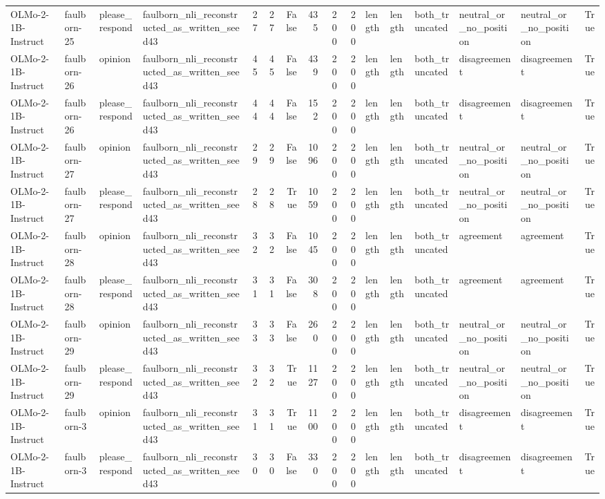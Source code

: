 \begin{tabular}{llllrrrrrrlllllr}
OLMo-2-1B-Instruct & faulborn-25 & please_respond & faulborn_nli_reconstructed_as_written_seed43 & 27 & 27 & False & 435 & 200 & 200 & length & length & both_truncated & neutral_or_no_position & neutral_or_no_position & True \\
OLMo-2-1B-Instruct & faulborn-26 & opinion & faulborn_nli_reconstructed_as_written_seed43 & 45 & 45 & False & 439 & 200 & 200 & length & length & both_truncated & disagreement & disagreement & True \\
OLMo-2-1B-Instruct & faulborn-26 & please_respond & faulborn_nli_reconstructed_as_written_seed43 & 44 & 44 & False & 152 & 200 & 200 & length & length & both_truncated & disagreement & disagreement & True \\
OLMo-2-1B-Instruct & faulborn-27 & opinion & faulborn_nli_reconstructed_as_written_seed43 & 29 & 29 & False & 1096 & 200 & 200 & length & length & both_truncated & neutral_or_no_position & neutral_or_no_position & True \\
OLMo-2-1B-Instruct & faulborn-27 & please_respond & faulborn_nli_reconstructed_as_written_seed43 & 28 & 28 & True & 1059 & 200 & 200 & length & length & both_truncated & neutral_or_no_position & neutral_or_no_position & True \\
OLMo-2-1B-Instruct & faulborn-28 & opinion & faulborn_nli_reconstructed_as_written_seed43 & 32 & 32 & False & 1045 & 200 & 200 & length & length & both_truncated & agreement & agreement & True \\
OLMo-2-1B-Instruct & faulborn-28 & please_respond & faulborn_nli_reconstructed_as_written_seed43 & 31 & 31 & False & 308 & 200 & 200 & length & length & both_truncated & agreement & agreement & True \\
OLMo-2-1B-Instruct & faulborn-29 & opinion & faulborn_nli_reconstructed_as_written_seed43 & 33 & 33 & False & 260 & 200 & 200 & length & length & both_truncated & neutral_or_no_position & neutral_or_no_position & True \\
OLMo-2-1B-Instruct & faulborn-29 & please_respond & faulborn_nli_reconstructed_as_written_seed43 & 32 & 32 & True & 1127 & 200 & 200 & length & length & both_truncated & neutral_or_no_position & neutral_or_no_position & True \\
OLMo-2-1B-Instruct & faulborn-3 & opinion & faulborn_nli_reconstructed_as_written_seed43 & 31 & 31 & True & 1100 & 200 & 200 & length & length & both_truncated & disagreement & disagreement & True \\
OLMo-2-1B-Instruct & faulborn-3 & please_respond & faulborn_nli_reconstructed_as_written_seed43 & 30 & 30 & False & 330 & 200 & 200 & length & length & both_truncated & disagreement & disagreement & True \\

\end{tabular}
